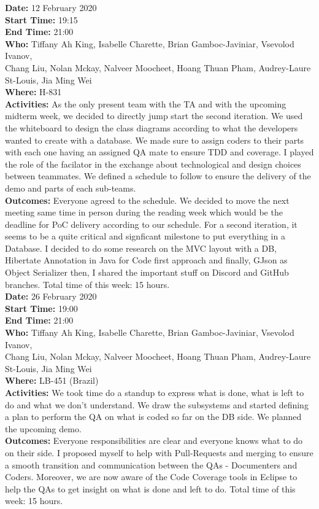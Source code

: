 \documentclass[12pt]{article}
\begin{document}
{\bf Date:} 12 February 2020\\
{\bf Start Time:} 19:15\\
{\bf End Time:} 21:00\\
{\bf Who:} Tiffany Ah King, Isabelle Charette, Brian Gamboc-Javiniar, Vsevolod Ivanov,\\
Chang Liu, Nolan Mckay, Nalveer Moocheet, Hoang Thuan Pham, Audrey-Laure St-Louis, Jia Ming Wei\\
{\bf Where:} H-831\\
{\bf Activities:} As the only present team with the TA and with the upcoming midterm week, we decided to directly jump start the second iteration. We used the whiteboard to design the class diagrams according to what the developers wanted to create with a database. We made sure to assign coders to their parts with each one having an assigned QA mate to ensure TDD and coverage. I played the role of the facilator in the exchange about technological and design choices between teammates. We defined a schedule to follow to ensure the delivery of the demo and parts of each sub-teams.\\
{\bf Outcomes:} Everyone agreed to the schedule. We decided to move the next meeting same time in person during the reading week which would be the deadline for PoC delivery according to our schedule. For a second iteration, it seems to be a quite critical and signficant milestone to put everything in a Database. I decided to do some research on the MVC layout with a DB, Hibertate Annotation in Java for Code first approach and finally, GJson as Object Serializer then, I shared the important stuff on Discord and GitHub branches. Total time of this week: 15 hours.\\

{\bf Date:} 26 February 2020\\
{\bf Start Time:} 19:00\\
{\bf End Time:} 21:00\\
{\bf Who:} Tiffany Ah King, Isabelle Charette, Brian Gamboc-Javiniar, Vsevolod Ivanov,\\
Chang Liu, Nolan Mckay, Nalveer Moocheet, Hoang Thuan Pham, Audrey-Laure St-Louis, Jia Ming Wei\\
{\bf Where:} LB-451 (Brazil)\\
{\bf Activities:} We took time do a standup to express what is done, what is left to do and what we don't understand. We draw the subsystems and started defining a plan to perform the QA on what is coded so far on the DB side. We planned the upcoming demo.\\
{\bf Outcomes:} Everyone responsibilities are clear and everyone knows what to do on their side. I proposed myself to help with Pull-Requests and merging to ensure a smooth transition and communication between the QAs - Documenters and Coders. Moreover, we are now aware of the Code Coverage tools in Eclipse to help the QAs to get insight on what is done and left to do. Total time of this week: 15 hours.\\
\end{document}
